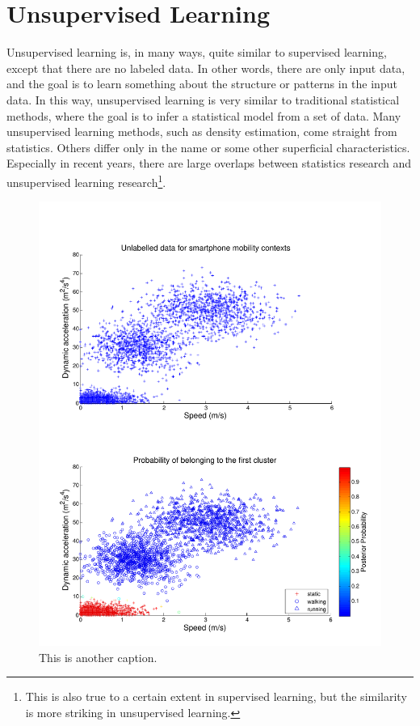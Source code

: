 \section{Unsupervised Learning}
\label{sec:unsupervised-learning}
Unsupervised learning is, in many ways, quite similar to supervised learning, except that there are no labeled data. In other words, there are only input data, and the goal is to learn something about the structure or patterns in the input data. In this way, unsupervised learning is very similar to traditional statistical methods, where the goal is to infer a statistical model from a set of data. Many unsupervised learning methods, such as density estimation, come straight from statistics. Others differ only in the name or some other superficial characteristics. Especially in recent years, there are large overlaps between statistics research and unsupervised learning research\footnote{This is also true to a certain extent in supervised learning, but the similarity is more striking in unsupervised learning.}.

\begin{figure}
  \begin{center}
    \includegraphics[width=1.0\textwidth]{figChapter3-2}
  \end{center}
  \caption[Data from smartphone]{This is another caption.}
  \label{fig:data-from-phone-unsupervised}
\end{figure}

